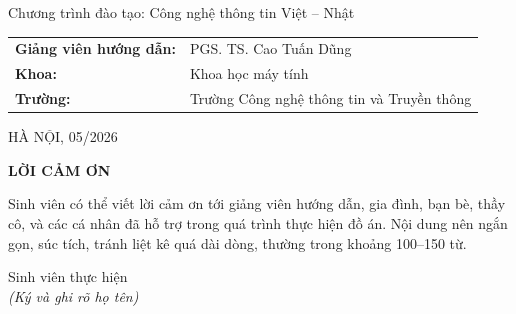 \documentclass[a4paper,12pt]{report}
\begin{document}
\begin{titlepage}
{\fontsize{13pt}{16pt}\selectfont
Chương trình đào tạo: Công nghệ thông tin Việt -- Nhật
\par}

\vspace{0.85cm}

\begin{flushleft}

\fontsize{12.5pt}{15pt}\selectfont

\begin{tabular}{p{5.6cm}p{8.7cm}}

\textbf{Giảng viên hướng dẫn:}
&
PGS. TS. Cao Tuấn Dũng
\\[7pt]

\textbf{Khoa:}
&
Khoa học máy tính
\\[7pt]

\textbf{Trường:}
&
Trường Công nghệ thông tin và Truyền thông
\\

\end{tabular}

\end{flushleft}

\vspace{0.12cm}

\begin{center}

{\fontsize{13.5pt}{16pt}\selectfont
HÀ NỘI, 05/2026
\par}

\end{center}

\end{titlepage}

\cleardoublepage
\thispagestyle{empty}

\begin{center}
    {\bfseries\fontsize{18pt}{20pt}\selectfont LỜI CẢM ƠN}
\end{center}

\vspace{1.5cm}

Sinh viên có thể viết lời cảm ơn tới giảng viên hướng dẫn, gia đình, bạn bè, 
thầy cô, và các cá nhân đã hỗ trợ trong quá trình thực hiện đồ án. 
Nội dung nên ngắn gọn, súc tích, tránh liệt kê quá dài dòng, 
thường trong khoảng 100--150 từ.

\vspace{2cm}

\begin{flushright}
Sinh viên thực hiện\\
{\itshape (Ký và ghi rõ họ tên)}
\end{flushright}
\end{document}
